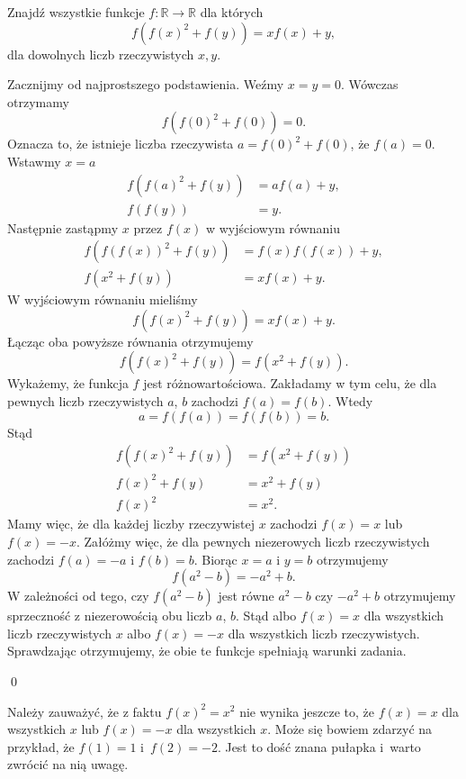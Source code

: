 \vspace{10px}


\noindent
Znajdź wszystkie funkcje $ f:\mathbb{R}\to\mathbb{R} $ dla których 
\[
	f(f(x)^2 + f(y)) = xf(x) + y,
\]
dla dowolnych liczb rzeczywistych $x, y$.


\noindent
Zacznijmy od najprostszego podstawienia. Weźmy $x = y = 0$. Wówczas otrzymamy
\[
	f(f(0)^2 + f(0)) = 0.
\]
Oznacza to, że istnieje  liczba rzeczywista $a = f(0)^2 + f(0)$, że $f(a) = 0$. Wstawmy $x = a$
\begin{align*}
	f(f(a)^2 + f(y)) &= af(a) + y, \\
	f(f(y)) &= y.
\end{align*}
Następnie zastąpmy $x$ przez $f(x)$ w wyjściowym równaniu
\begin{align*}
	f(f(f(x))^2 + f(y)) &= f(x)f(f(x)) + y, \\
	f(x^2 + f(y)) &= xf(x) + y.
\end{align*}
W wyjściowym równaniu mieliśmy
\[
	f(f(x)^2 + f(y)) = xf(x) + y.
\]
Łącząc oba powyższe równania otrzymujemy
\[
	f(f(x)^2 + f(y)) = f(x^2 + f(y)).
\]
Wykażemy, że funkcja $f$ jest różnowartościowa. Zakładamy w tym celu, że dla pewnych liczb rzeczywistych $a$, $b$ zachodzi $f(a) = f(b)$. Wtedy
\[
	a = f(f(a)) = f(f(b)) = b.
\]
Stąd
\begin{align*}
	f(f(x)^2 + f(y)) &= f(x^2 + f(y)) \\
	f(x)^2 + f(y) &= x^2 + f(y) \\
	f(x)^2 &= x^2.
\end{align*}
Mamy więc, że dla każdej liczby rzeczywistej $x$ zachodzi $f(x) = x$ lub $f(x) = -x$. Załóżmy więc, że dla pewnych niezerowych liczb rzeczywistych zachodzi $f(a) = -a$ i $f(b) = b$. Biorąc $x = a$ i $y = b$ otrzymujemy
\[
	f(a^2 - b) = -a^2 + b.
\]
W zależności od tego, czy $f(a^2 - b)$ jest równe $a^2 - b$ czy $-a^2 + b$ otrzymujemy sprzeczność z niezerowością obu liczb $a$, $b$. Stąd albo $f(x) = x$ dla wszystkich liczb rzeczywistych $x$ albo $f(x) = -x$ dla wszystkich liczb rzeczywistych. Sprawdzając otrzymujemy, że obie te funkcje spełniają warunki zadania.

\qed

\vspace{10px}
\noindent
Należy zauważyć, że z faktu $f(x)^2 = x^2$ nie wynika jeszcze to, że $f(x) = x$ dla wszystkich $x$ lub $f(x) = -x$ dla wszystkich $x$. Może się bowiem zdarzyć na przykład, że $f(1) = 1$ i~$f(2) = -2$. Jest to dość znana pułapka i~warto zwrócić na nią uwagę.
